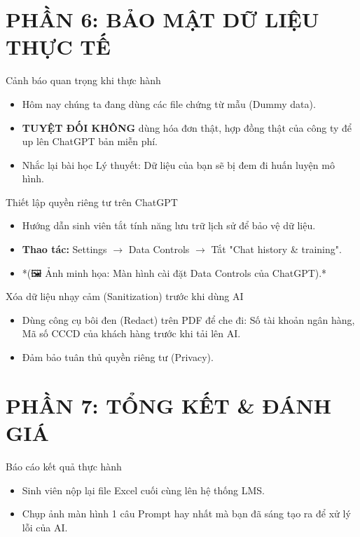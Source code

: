 \documentclass[aspectratio=169]{beamer}
\begin{document}
\section{PHẦN 6: BẢO MẬT DỮ LIỆU THỰC TẾ}


\begin{frame}{Cảnh báo quan trọng khi thực hành}
    \begin{itemize}
        \item Hôm nay chúng ta đang dùng các file chứng từ mẫu (Dummy data).
        \item \textbf{TUYỆT ĐỐI KHÔNG} dùng hóa đơn thật, hợp đồng thật của công ty để up lên ChatGPT bản miễn phí.
        \item Nhắc lại bài học Lý thuyết: Dữ liệu của bạn sẽ bị đem đi huấn luyện mô hình.
    \end{itemize}
\end{frame}


\begin{frame}{Thiết lập quyền riêng tư trên ChatGPT}
    \begin{itemize}
        \item Hướng dẫn sinh viên tắt tính năng lưu trữ lịch sử để bảo vệ dữ liệu.
        \item \textbf{Thao tác:} Settings $\rightarrow$ Data Controls $\rightarrow$ Tắt "Chat history \& training".
        \item *(🖼️ Ảnh minh họa: Màn hình cài đặt Data Controls của ChatGPT).*
    \end{itemize}
\end{frame}


\begin{frame}{Xóa dữ liệu nhạy cảm (Sanitization) trước khi dùng AI}
    \begin{itemize}
        \item Dùng công cụ bôi đen (Redact) trên PDF để che đi: Số tài khoản ngân hàng, Mã số CCCD của khách hàng trước khi tải lên AI.
        \item Đảm bảo tuân thủ quyền riêng tư (Privacy).
    \end{itemize}
\end{frame}


\section{PHẦN 7: TỔNG KẾT \& ĐÁNH GIÁ}


\begin{frame}{Báo cáo kết quả thực hành}
    \begin{itemize}
        \item Sinh viên nộp lại file Excel cuối cùng lên hệ thống LMS.
        \item Chụp ảnh màn hình 1 câu Prompt hay nhất mà bạn đã sáng tạo ra để xử lý lỗi của AI.
    \end{itemize}
\end{frame}
\end{document}
